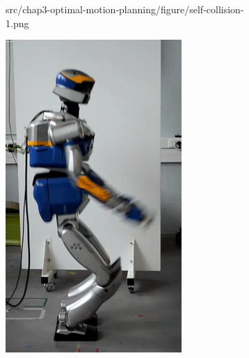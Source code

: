 \begin{figure}
\begin{subfigure}{0.19\columnwidth}
                    {src/chap3-optimal-motion-planning/figure/self-collision-1.png}
    \label{self-collision-1}
  \end{subfigure}
  \begin{subfigure}{0.19\columnwidth}
    \centering
    \includegraphics[width = \columnwidth]
                    {src/chap3-optimal-motion-planning/figure/self-collision-2.png}
    \label{self-collision-2}
  \end{subfigure}
  \begin{subfigure}{0.19\columnwidth}

\end{subfigure}
\end{figure}
